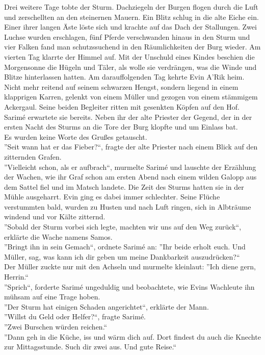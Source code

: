 Drei weitere Tage tobte der Sturm. Dachziegeln der Burgen flogen durch die Luft und zerschellten an 
den steinernen Mauern. Ein Blitz schlug in die alte Eiche ein. Einer ihrer langen Äste löste sich 
und krachte auf das Dach der Stallungen. Zwei Luchse wurden erschlagen, fünf Pferde verschwanden 
hinaus in den Sturm und vier Falken fand man schutzssuchend in den Räumlichkeiten der Burg wieder. 
Am vierten Tag klarrte der Himmel auf. Mit der Unschuld eines Kindes beschien die Morgensonne die 
Hügeln und Täler, als wolle sie verdrängen, was die Winde und Blitze hinterlassen hatten. Am 
darauffolgenden Tag kehrte Evin A'Rik heim. Nicht mehr reitend auf seinem schwarzen Hengst, sondern 
liegend in einem klapprigen Karren, gelenkt von einem Müller und gezogen von einem stämmigem 
Ackergaul. Seine beiden Begleiter ritten mit gesenkten Köpfen auf den Hof. Sarimé erwartete sie 
bereits. Neben ihr der alte Priester der Gegend, der in der ersten Nacht des Sturms an die Tore der 
Burg klopfte und um Einlass bat.\\
Es wurden keine Worte des Grußes getauscht.\\
''Seit wann hat er das Fieber?``, fragte der alte Priester nach einem Blick auf den zitternden 
Grafen.\\
''Vielleicht schon, als er aufbrach``, murmelte Sarimé und lauschte der Erzählung der Wachen, wie 
ihr Graf schon am ersten Abend nach einem wilden Galopp aus dem Sattel fiel und im Matsch landete. 
Die Zeit des Sturms hatten sie in der Mühle ausgeharrt. Evin ging es dabei immer schlechter. 
Seine Flüche verstummten bald, wurden zu Husten und nach Luft ringen, sich in Albträume windend und 
vor Kälte zitternd.\\
''Sobald der Sturm vorbei sich legte, machten wir uns auf den Weg zurück``, erklärte die Wache 
namens Samos.\\
''Bringt ihn in sein Gemach``, ordnete Sarimé an: ''Ihr beide erholt euch. Und Müller, sag, was 
kann ich dir geben um meine Dankbarkeit auszudrücken?``\\
Der Müller zuckte nur mit den Achseln und murmelte kleinlaut: ''Ich diene gern, Herrin.``\\
''Sprich``, forderte Sarimé ungeduldig und beobachtete, wie Evins Wachleute ihn mühsam auf eine 
Trage hoben.\\
''Der Sturm hat einigen Schaden angerichtet``, erklärte der Mann.\\
''Willst du Geld oder Helfer?``, fragte Sarimé.\\
''Zwei Burschen würden reichen.``\\
''Dann geh in die Küche, iss und wärm dich auf. Dort findest du auch die Knechte zur Mittagsstunde. 
Such dir zwei aus. Und gute Reise.``\\

